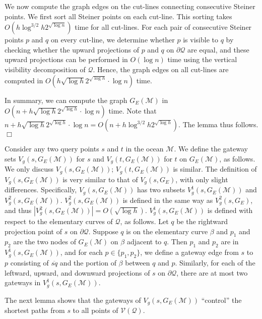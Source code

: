 \documentclass[english,runningheads,11pt]{llncs}
\def\calM{\mathcal{M}}
\def\calQ{\mathcal{Q}}
\def\calV{\mathcal{V}}
\newenvironment{proof}{\noindent {\textbf{Proof:}}\rm}{\hfill $\Box$\rm}
\begin{document}
\begin{proof}
We now compute the graph edges on the cut-lines connecting consecutive
Steiner points. We first sort all Steiner points on each cut-line. This
sorting takes $O(h\log^{3/2} h2^{\sqrt{\log n}})$ time for all
cut-lines. For each pair of consecutive Steiner points $p$ and $q$ on
every cut-line, we determine whether $p$ is visible to $q$ by
checking whether the upward projections of $p$ and $q$ on
$\partial\calQ$ are equal, and these upward projections can be
performed in $O(\log n)$ time using the vertical visibility
decomposition of $\calQ$. Hence, the graph edges on all cut-lines are
computed in $O(h\sqrt{\log h}2^{\sqrt{\log h}}\cdot\log n)$ time.

In summary, we can compute the graph $G_E(\calM)$ in $O(n+h\sqrt{\log
h}2^{\sqrt{\log h}}\cdot\log n)$ time. Note that $n+h\sqrt{\log
h}2^{\sqrt{\log h}}\cdot\log n=O(n+h\log^{3/2} h2^{\sqrt{\log h}})$. The
lemma thus follows.
\end{proof}


Consider any two query points $s$ and $t$ in the ocean
$\calM$. We define the gateway sets
$V_g(s,G_E(\calM))$ for $s$ and $V_g(t,G_E(\calM))$ for $t$ on $G_E(\calM)$,
as follows. We only discuss $V_g(s,G_E(\calM))$;
$V_g(t,G_E(\calM))$ is similar. The definition of
$V_g(s,G_E(\calM))$ is very similar to that of $V_g(s,G_E)$, with only
slight differences. Specifically, $V_g(s,G_E(\calM))$ has two subsets
$V^1_g(s,G_E(\calM))$ and $V^2_g(s,G_E(\calM))$.
$V^2_g(s,G_E(\calM))$ is defined in the same way as
$V^2_g(s,G_E)$, and thus $|V^2_g(s,G_E(\calM))|=O(\sqrt{\log h})$.
$V^1_g(s,G_E(\calM))$ is defined with respect to the elementary
curves of $\calQ$, as follows. Let $q$ be the rightward projection point of $s$
on $\partial\calQ$. Suppose $q$ is on the elementary curve $\beta$ and
$p_1$ and $p_2$ are the two
nodes of $G_E(\calM)$ on $\beta$ adjacent to $q$. Then $p_1$ and $p_2$
are in $V^1_g(s,G_E(\calM))$, and for each $p\in
\{p_1,p_2\}$, we define a gateway edge from $s$ to $p$ consisting of
$\overline{sq}$ and the portion of $\beta$ between $q$ and $p$. Similarly,
for each of the leftward, upward, and downward projections of $s$ on
$\partial\calQ$, there are at most two gateways in $V^1_g(s,G_E(\calM))$.

The next lemma shows that the gateways of $V_g(s,G_E(\calM))$
``control'' the shortest paths from $s$ to all points of $\calV(\calQ)$.
\end{document}
